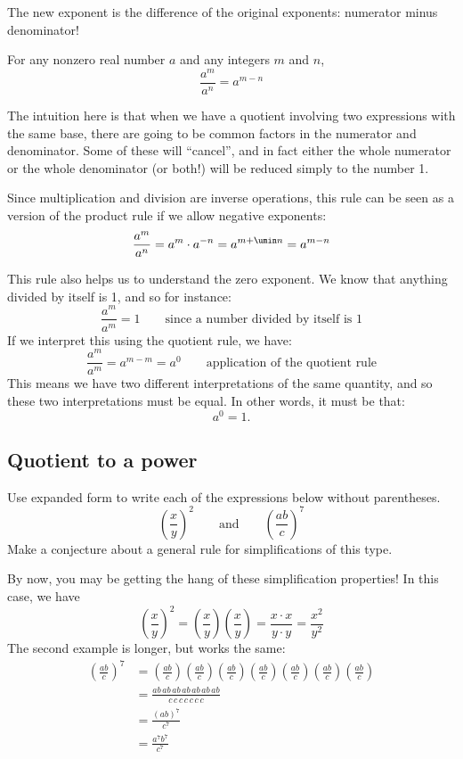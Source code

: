 The new exponent is the difference of the original exponents: numerator minus denominator!

\begin{boxeddef}
For any nonzero real number $a$ and any integers $m$ and $n$, \[\frac{a^m}{a^n} = a^{m-n}\]
\end{boxeddef}

The intuition here is that when we have a quotient involving two expressions with the same base, there are going to be common factors in the numerator and denominator. Some of these will ``cancel'', and in fact either the whole numerator or the whole denominator (or both!) will be reduced simply to the number 1.

Since multiplication and division are inverse operations, this rule can be seen as a version of the product rule if we allow negative exponents:
\[\frac{a^m}{a^n} = a^m \cdot a^{-n} = a^{m+\umin n} = a^{m-n}\]

This rule also helps us to understand the zero exponent. We know that anything divided by itself is 1, and so for instance: \[\frac{a^m}{a^m} = 1 \qquad\text{since a number divided by itself is 1}\]
If we interpret this using the quotient rule, we have: \[\frac{a^m}{a^m} = a^{m-m} = a^0 \qquad\text{application of the quotient rule}\]
This means we have two different interpretations of the same quantity, and so these two interpretations must be equal. In other words, it must be that: \[a^0 = 1.\]


\subsection{Quotient to a power}

\begin{boxedexplore}
Use expanded form to write each of the expressions below without parentheses.
\[\left(\frac{x}{y}\right)^2 \qquad\text{and}\qquad \left(\frac{ab}{c}\right)^7\]
Make a conjecture about a general rule for simplifications of this type.
\end{boxedexplore}

By now, you may be getting the hang of these simplification properties! In this case, we have
\[\left(\frac{x}{y}\right)^2 = \left(\frac{x}{y}\right)\left(\frac{x}{y}\right) = \frac{x\cdot x}{y\cdot y} = \frac{x^2}{y^2}\]
The second example is longer, but works the same:
\[\begin{aligned}
\left(\frac{ab}{c}\right)^7
&= \left(\frac{ab}{c}\right)\left(\frac{ab}{c}\right)\left(\frac{ab}{c}\right)\left(\frac{ab}{c}\right)\left(\frac{ab}{c}\right)\left(\frac{ab}{c}\right)\left(\frac{ab}{c}\right)
\\[1ex]&= \frac{ab\,ab\,ab\,ab\,ab\,ab\,ab}{c\,c\,c\,c\,c\,c\,c}
\\[1ex]&= \frac{(ab)^7}{c^7}
\\[1ex]&= \frac{a^7b^7}{c^7}
\end{aligned}\]

